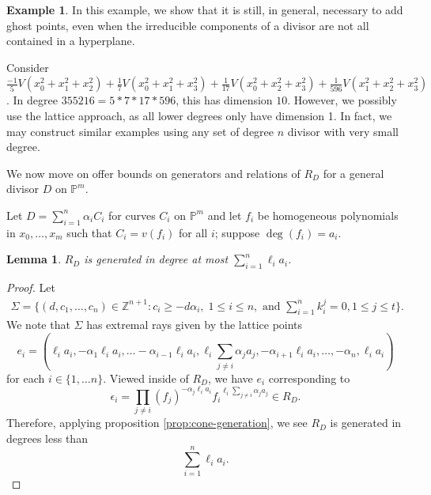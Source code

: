 \documentclass{amsart}
\theoremstyle{plain}
\newtheorem{lem}[thm]{Lemma}
\theoremstyle{definition}
\newtheorem{example}[thm]{Example}
\theoremstyle{remark}
\numberwithin{equation}{section}
\newcommand\bp{{\mathbb P}}
\newcommand\bz{{\mathbb Z}}
\newcommand\bida{a}
\begin{document}
\begin{example}
\label{eg:radical}
In this example, we show that it is still, in general, necessary to add ghost points, even when the irreducible components of a divisor are not all contained in a hyperplane.

Consider $\frac{-1}{5}V(x_0^2 + x_1^2 + x_2^2) + \frac{1}{7}V(x_0^2 + x_1^2 + x_3^2) + \frac{1}{17}V(x_0^2 + x_2^2 + x_3^2) + \frac{1}{596}V(x_1^2 + x_2^2 + x_3^2)$. In degree $355216 = 5* 7 * 17 * 596$, this has dimension $10$. 
However, we possibly use the lattice approach, as all lower degrees only have dimension 1. In fact, we may construct similar examples using any set of degree $n$ divisor with very small degree.
\end{example}

We now move on offer bounds on generators and relations of $R_D$ for a general divisor $D$ on $\bp^m$.

Let $D = \sum_{i=1}^n \alpha_i C_i$ for curves $C_i$ on $\mathbb{P}^m$ and let $f_i$ be homogeneous polynomials in $x_0, \ldots, x_m$ such that $C_i = v(f_i)$ for all $i$; suppose $\deg(f_i) = a_i$. 
\begin{lem} \label{P-m-generators}
$R_D$ is generated in degree at most $\sum_{i=1}^n \ell_i a_i$.
\end{lem}
\begin{proof}
Let 
\begin{align}\label{eqn:Sigma-def}
	\Sigma = \{(d, c_1, \ldots, c_n) \in \bz^{n+1} : c_i \geq - d \alpha_i, \; 1 \leq i \leq n, \text{ and } \sum_{i=1}^{n}k_i^j = 0, 1 \leq j \leq t\}.
\end{align}
We note that $\Sigma$ has extremal rays given by the lattice points 
\begin{equation}\label{defn:e_i-P-n}
	e_i = (\ell_i \bida_i, - \alpha_1 \ell_i \bida_i, \ldots -\alpha_{i-1} \ell_i \bida_i, \ell_i \sum_{j\ne i} \alpha_j \bida_j, -\alpha_{i+1} \ell_i \bida_i, \ldots, -\alpha_n, \ell_i \bida_i)
\end{equation}
for each $i\in \{1, \ldots n\}$.
Viewed inside of $R_D$, we have $e_i$ corresponding to
\begin{equation}\label{eqn:epilon-def-P-m}
	\epsilon_i = \prod_{j\ne i} (f_j)^{-\alpha_j \ell_i a_i} {f_i}^{\ell_i \sum_{j\ne i} \alpha_j a_j}\in R_D.
\end{equation}
Therefore, applying proposition \ref{prop:cone-generation}, we see $R_D$ is generated in degrees less than
\[
	\sum_{i=1}^n \ell_i a_i.
\]
\end{proof}
\end{document}
